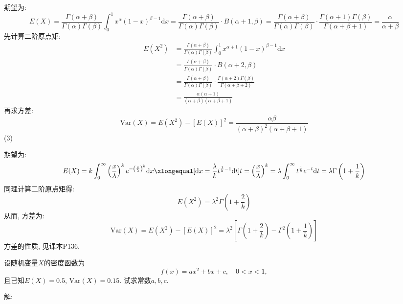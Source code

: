 \documentclass[standard]{ExBook}
\renewenvironment{shaded}{%
  \def\FrameCommand{\fboxsep=\FrameSep \colorbox{shadecolor}}%
  \MakeFramed{\advance\hsize-\width \FrameRestore}%
}{%
  \endMakeFramed
}
\begin{document}
\begin{qitems}
期望为:
$$E(X)=\displaystyle\frac{\Gamma(\alpha+\beta)}{\Gamma(\alpha)\Gamma(\beta)}\int_{0}^{1}x^{\alpha}(1-x)^{\beta-1}\mathrm{d}x=\frac{\Gamma(\alpha+\beta)}{\Gamma(\alpha)\Gamma(\beta)}\cdot B(\alpha+1,\beta)=\frac{\Gamma(\alpha+\beta)}{\Gamma(\alpha)\Gamma(\beta)} \cdot \frac{\Gamma(\alpha+1)\Gamma(\beta)}{\Gamma(\alpha+\beta+1)}=\frac{\alpha}{\alpha+\beta}$$
先计算二阶原点矩:
$$
\begin{aligned}
E(X^2)
&=\displaystyle\frac{\Gamma(\alpha+\beta)}{\Gamma(\alpha)\Gamma(\beta)}\int_{0}^{1}x^{\alpha+1}(1-x)^{\beta-1}\mathrm{d}x\\
&=\frac{\Gamma(\alpha+\beta)}{\Gamma(\alpha)\Gamma(\beta)}\cdot B(\alpha+2,\beta)\\
&=\frac{\Gamma(\alpha+\beta)}{\Gamma(\alpha)\Gamma(\beta)} \cdot \frac{\Gamma(\alpha+2)\Gamma(\beta)}{\Gamma(\alpha+\beta+2)}\\
&=\frac{\alpha(\alpha+1)}{(\alpha+\beta)(\alpha+\beta+1)}
\end{aligned}
$$
再求方差:
$$\mathrm{Var}(X)=E(X^2)-\left[E(X)\right]^2=\frac{\alpha\beta}{(\alpha+\beta)^2 (\alpha+\beta+1)}$$
(3)

期望为:
$$E(X)=\displaystyle k\int_{0}^{\infty}\left(\frac{x}{\lambda}\right)^{k}e^{-\left(\frac{x}{\lambda}\right)^{k}}\mathrm{d}x \xlongequal[\mathrm{d}x=\frac{\lambda}{k}t^{\frac{1}{k}-1}\mathrm{d}t]{t=\left(\frac{x}{\lambda}\right)^k}=\lambda\int_{0}^{\infty}t^{\frac{1}{k}}e^{-t}\mathrm{d}t=\lambda\Gamma\left(1+\frac{1}{k}\right)$$
同理计算二阶原点矩得:
$$E(X^2)=\lambda^2\Gamma\left(1+\frac{2}{k}\right)$$
从而, 方差为:
$$\mathrm{Var}(X)=E(X^2)-\left[E(X)\right]^2=\lambda^2\left[\Gamma\left(1+\frac{2}{k}\right)-\Gamma^2\left(1+\frac{1}{k}\right)\right]$$
\textcolor{themeColor}{\selectfont {}
方差的性质, 见课本P136.}

\vspace{2.5cm-5em}

    \begin{bbox}
    \begin{shaded}
        \qitem
设随机变量$X$的密度函数为
$$f(x)=ax^2+bx+c,\quad 0<x<1,$$
且已知$E(X)=0.5$, $\mathrm{Var}(X)=0.15$. 试求常数$a,b,c$.
    \end{shaded}
    \end{bbox}

\vspace{\dimexpr2.5cm-5em\relax}

解: 


\end{qitems}
\end{document}
